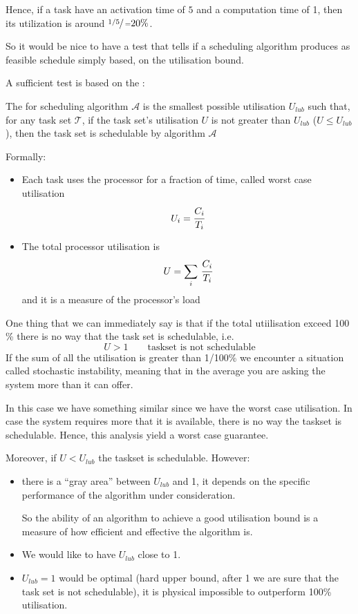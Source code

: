 Hence, if a task have an activation time of $5$ and a computation time of 1, then its utilization is around $\sfrac{1/5}  = 20\%$.

So it would be nice to have a test that tells if a scheduling algorithm produces as feasible schedule simply based, on the utilisation bound.

A sufficient test  is based on the :

The  for scheduling algorithm $\mathcal{A}$ is the smallest possible utilisation $U_{lub}$ such that, for any task set $\mathcal{T}$, if the task set's utilisation $U$ is not greater than $U_{lub}$ ($U\le U_{lub}$), then the task set is schedulable by algorithm $\mathcal{A}$

Formally:
\begin{itemize}
\item Each task uses the processor for a fraction of time, called worst case utilisation
\[U_i = \cfrac{C_i}{T_i}\]
\item The total processor utilisation is 
\[ U = \sum_i \,\cfrac{C_i}{T_i}\]
and it is a measure of the processor's load
\end{itemize}

One thing that we can immediately say is that if the total utiilisation exceed 100 \% there is no way that the task set is schedulable, i.e.
\[U > 1\qquad\text{taskset is not schedulable}\]
If the sum of all the utilisation is greater than 1/100\% we encounter a situation called stochastic instability, meaning that in the average you are asking the system more than it can offer.

In this case we have something similar since we have the worst case utilisation. In case the system requires more that it is available, there is no way the taskset is schedulable. Hence, this analysis yield a worst case guarantee.

Moreover, if $U < U_{lub}$ the taskset is schedulable. However:
\begin{itemize}
\item there is a ``gray area'' between $U_{lub}$ and 1, it depends on the specific performance of the algorithm under consideration.

So the ability of an algorithm to achieve a good utilisation bound is a measure of how efficient and effective the algorithm is.
\item We would like to have $U_{lub}$ close to 1.
\item $U_{lub} = 1$ would be optimal (hard upper bound, after 1 we are sure that the task set is not schedulable), it is physical impossible to outperform 100\% utilisation.
\end{itemize}

